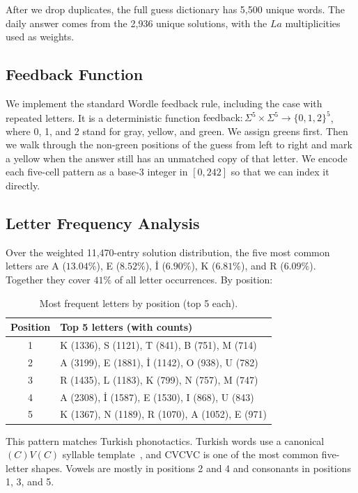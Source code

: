 \documentclass[conference]{IEEEtran}
\begin{document}
After we drop duplicates, the full guess dictionary has 5{,}500 unique
words. The daily answer comes from the 2{,}936 unique solutions, with
the $La$ multiplicities used as weights.

\subsection{Feedback Function}

We implement the standard Wordle feedback rule, including the case
with repeated letters. It is a deterministic function
$\mathrm{feedback}: \Sigma^5 \times \Sigma^5 \to \{0,1,2\}^5$, where
0, 1, and 2 stand for gray, yellow, and green. We assign greens first.
Then we walk through the non-green positions of the guess from left to
right and mark a yellow when the answer still has an unmatched copy of
that letter. We encode each five-cell pattern as a base-3 integer in
$[0, 242]$ so that we can index it directly.

\subsection{Letter Frequency Analysis}

Over the weighted 11{,}470-entry solution distribution, the five most
common letters are A ($13.04\%$), E ($8.52\%$), \.I ($6.90\%$),
K ($6.81\%$), and R ($6.09\%$). Together they cover $41\%$ of all
letter occurrences. By position:

\begin{table}[h]
\centering
\caption{Most frequent letters by position (top 5 each).}
\label{tab:positional}
\begin{tabular}{cl}
\toprule
Position & Top 5 letters (with counts) \\
\midrule
1 & K (1336), S (1121), T (841), B (751), M (714) \\
2 & A (3199), E (1881), \.I (1142), O (938), U (782) \\
3 & R (1435), L (1183), K (799), N (757), M (747) \\
4 & A (2308), \.I (1587), E (1530), I (868), U (843) \\
5 & K (1367), N (1189), R (1070), A (1052), E (971) \\
\bottomrule
\end{tabular}
\end{table}

This pattern matches Turkish phonotactics. Turkish words use a
canonical $(C)V(C)$ syllable template~\cite{goksel2005turkish}, and
CVCVC is one of the most common five-letter shapes. Vowels are mostly
in positions 2 and 4 and consonants in positions 1, 3, and 5.
\end{document}
